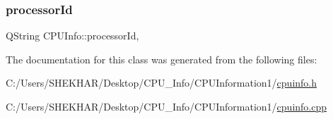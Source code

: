 \subsubsection{\texorpdfstring{processor\+Id}{processorId}}
{\footnotesize\ttfamily Q\+String C\+P\+U\+Info\+::processor\+Id\hspace{0.3cm}{\ttfamily [read]}, {\ttfamily [write]}}



The documentation for this class was generated from the following files\+:\begin{DoxyCompactItemize}
\item 
C\+:/\+Users/\+S\+H\+E\+K\+H\+A\+R/\+Desktop/\+C\+P\+U\+\_\+\+Info/\+C\+P\+U\+Information1/\hyperlink{cpuinfo_8h}{cpuinfo.\+h}\item 
C\+:/\+Users/\+S\+H\+E\+K\+H\+A\+R/\+Desktop/\+C\+P\+U\+\_\+\+Info/\+C\+P\+U\+Information1/\hyperlink{cpuinfo_8cpp}{cpuinfo.\+cpp}\end{DoxyCompactItemize}
